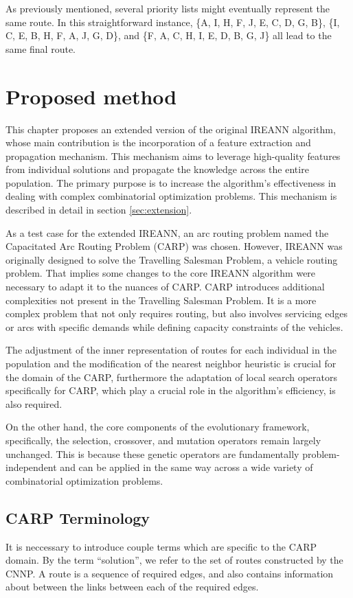 \documentclass[twoside]{ctuthesis}
\theoremstyle{plain}
\theoremstyle{definition}
\theoremstyle{note}
\begin{document}
As previously mentioned, several priority lists might eventually represent the same route. In this straightforward instance, \{A, I, H, F, J, E, C, D, G, B\}, \{I, C, E, B, H, F, A, J, G, D\}, and \{F, A, C, H, I, E, D, B, G, J\} all lead to the same final route.

\chapter{Proposed method}
This chapter proposes an extended version of the original IREANN algorithm, whose main contribution is the incorporation of a feature extraction and propagation mechanism. This mechanism aims to leverage high-quality features from individual solutions and propagate the knowledge across the entire population. The primary purpose is to increase the algorithm's effectiveness in dealing with complex combinatorial optimization problems. This mechanism is described in detail in section \ref{sec:extension}.

As a test case for the extended IREANN, an arc routing problem named the Capacitated Arc Routing Problem (CARP) was chosen. However, IREANN was originally designed to solve the Travelling Salesman Problem, a vehicle routing problem. That implies some changes to the core IREANN algorithm were necessary to adapt it to the nuances of CARP. CARP introduces additional complexities not present in the Travelling Salesman Problem. It is a more complex problem that not only requires routing, but also involves servicing edges or arcs with specific demands while defining capacity constraints of the vehicles.

The adjustment of the inner representation of routes for each individual in the population and the modification of the nearest neighbor heuristic is crucial for the domain of the CARP, furthermore the adaptation of local search operators specifically for CARP, which play a crucial role in the algorithm's efficiency, is also required.

On the other hand, the core components of the evolutionary framework, specifically, the selection, crossover, and mutation operators remain largely unchanged. This is because these genetic operators are fundamentally problem-independent and can be applied in the same way across a wide variety of combinatorial optimization problems.


\section{CARP Terminology}
It is neccessary to introduce couple terms which are specific to the CARP domain. By the term ``solution'', we refer to the set of routes constructed by the CNNP. A route is a sequence of required edges, and also contains information about between the links between each of the required edges.
\end{document}
